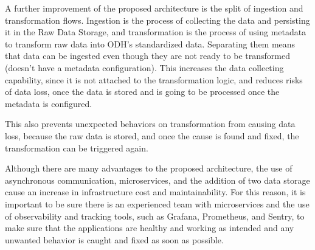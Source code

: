 A further improvement of the proposed architecture is the split of ingestion and transformation flows. Ingestion is the process of collecting the data and persisting it in the Raw Data Storage, and transformation is the process of using metadata to transform raw data into ODH's standardized data. Separating them means that data can be ingested even though they are not ready to be transformed (doesn't have a metadata configuration). This increases the data collecting capability, since it is not attached to the transformation logic, and reduces risks of data loss, once the data is stored and is going to be processed once the metadata is configured.

This also prevents unexpected behaviors on transformation from causing data loss, because the raw data is stored, and once the cause is found and fixed, the transformation can be triggered again.

Although there are many advantages to the proposed architecture, the use of asynchronous communication, microservices, and the addition of two data storage cause an increase in infrastructure cost and maintainability. For this reason, it is important to be sure there is an experienced team with microservices and the use of observability and tracking tools, such as Grafana, Prometheus, and Sentry, to make sure that the applications are healthy and working as intended and any unwanted behavior is caught and fixed as soon as possible.
